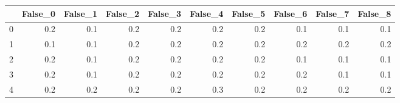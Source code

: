 \begin{tabular}{lrrrrrrrrr}
\toprule
{} &  False\_0 &  False\_1 &  False\_2 &  False\_3 &  False\_4 &  False\_5 &  False\_6 &  False\_7 &  False\_8 \\ \hline
\midrule
0 &      0.2 &      0.1 &      0.2 &      0.2 &      0.2 &      0.2 &      0.1 &      0.1 &      0.1 \\ \hline
1 &      0.1 &      0.1 &      0.2 &      0.2 &      0.2 &      0.2 &      0.2 &      0.2 &      0.2 \\ \hline
2 &      0.2 &      0.1 &      0.2 &      0.2 &      0.2 &      0.2 &      0.1 &      0.1 &      0.1 \\ \hline
3 &      0.2 &      0.1 &      0.2 &      0.2 &      0.2 &      0.2 &      0.2 &      0.1 &      0.1 \\ \hline
4 &      0.2 &      0.2 &      0.2 &      0.2 &      0.3 &      0.2 &      0.2 &      0.2 &      0.2 \\ \hline
\bottomrule
\end{tabular}
